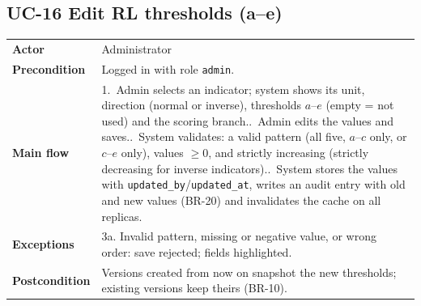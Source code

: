 \documentclass[11pt,a4paper]{article}
\begin{document}
\noindent\begin{minipage}{\linewidth}
\subsection*{UC-16 Edit RL thresholds (a--e)}
\begin{tabularx}{\linewidth}{@{}>{\raggedright\leavevmode\bfseries\color{creBlue}}p{2.6cm} Y@{}}
\toprule
Actor & Administrator \\
Precondition & Logged in with role \texttt{admin}. \\
Main flow & 1.~Admin selects an indicator; system shows its unit, direction (normal or inverse), thresholds $a$--$e$ (empty = not used) and the scoring branch..~Admin edits the values and saves..~System validates: a valid pattern (all five, $a$--$c$ only, or $c$--$e$ only), values $\ge 0$, and strictly increasing (strictly decreasing for inverse indicators)..~System stores the values with \texttt{updated\_by}/\texttt{updated\_at}, writes an audit entry with old and new values (BR-20) and invalidates the cache on all replicas. \\
Exceptions & 3a. Invalid pattern, missing or negative value, or wrong order: save rejected; fields highlighted. \\
Postcondition & Versions created from now on snapshot the new thresholds; existing versions keep theirs (BR-10). \\
\bottomrule
\end{tabularx}
\end{minipage}
\par\medskip
\end{document}

